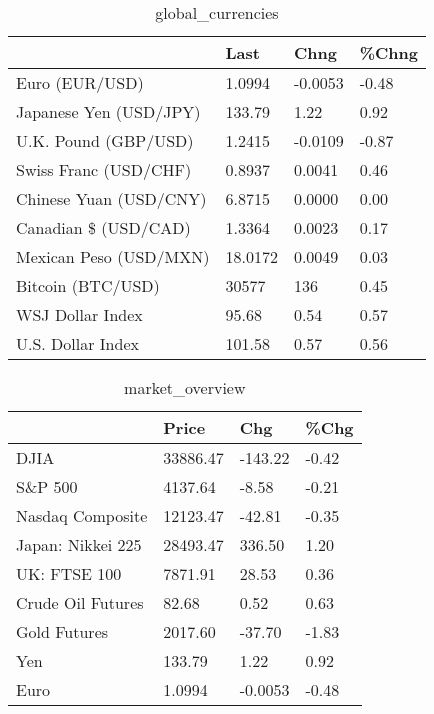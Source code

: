 \documentclass{article}%
\begin{document}
%


\begin{table}[htbp]%
\caption{global\_currencies}%
\centering%
\begin{adjustbox}{width=1\textwidth}%
\begin{tabular}{llll}
\toprule
                       &    Last &    Chng & \%Chng \\
\midrule
        Euro (EUR/USD) &  1.0994 & -0.0053 & -0.48 \\
Japanese Yen (USD/JPY) &  133.79 &    1.22 &  0.92 \\
  U.K. Pound (GBP/USD) &  1.2415 & -0.0109 & -0.87 \\
 Swiss Franc (USD/CHF) &  0.8937 &  0.0041 &  0.46 \\
Chinese Yuan (USD/CNY) &  6.8715 &  0.0000 &  0.00 \\
  Canadian \$ (USD/CAD) &  1.3364 &  0.0023 &  0.17 \\
Mexican Peso (USD/MXN) & 18.0172 &  0.0049 &  0.03 \\
     Bitcoin (BTC/USD) &   30577 &     136 &  0.45 \\
      WSJ Dollar Index &   95.68 &    0.54 &  0.57 \\
     U.S. Dollar Index &  101.58 &    0.57 &  0.56 \\
\bottomrule
\end{tabular}
%
\end{adjustbox}%
\end{table}

%


\begin{table}[htbp]%
\caption{market\_overview}%
\centering%
\begin{adjustbox}{width=1\textwidth}%
\begin{tabular}{llll}
\toprule
                  &    Price &     Chg &  \%Chg \\
\midrule
             DJIA & 33886.47 & -143.22 & -0.42 \\
          S\&P 500 &  4137.64 &   -8.58 & -0.21 \\
 Nasdaq Composite & 12123.47 &  -42.81 & -0.35 \\
Japan: Nikkei 225 & 28493.47 &  336.50 &  1.20 \\
     UK: FTSE 100 &  7871.91 &   28.53 &  0.36 \\
Crude Oil Futures &    82.68 &    0.52 &  0.63 \\
     Gold Futures &  2017.60 &  -37.70 & -1.83 \\
              Yen &   133.79 &    1.22 &  0.92 \\
             Euro &   1.0994 & -0.0053 & -0.48 \\
\bottomrule
\end{tabular}
%
\end{adjustbox}%
\end{table}

%
\end{document}
